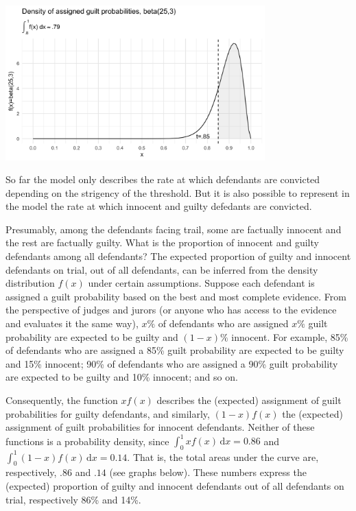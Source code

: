 \documentclass[10pt,dvipsnames]{scrartcl}
\begin{document}
\begin{center}
    \includegraphics[width=10cm]{dbeta(25,3)2.png}
\end{center}

So far the model only describes the rate at which defendants are
convicted depending on the strigency of the threshold. But it is also
possible to represent in the model the rate at which innocent and guilty
defedants are convicted.

Presumably, among the defendants facing trail, some are factually
innocent and the rest are factually guilty. What is the proportion of
innocent and guilty defendants among all defendants? The expected
proportion of guilty and innocent defendants on trial, out of all
defendants, can be inferred from the density distribution \(f(x)\) under
certain assumptions. Suppose each defendant is assigned a guilt
probability based on the best and most complete evidence. From the
perspective of judges and jurors (or anyone who has access to the
evidence and evaluates it the same way), \(x\%\) of defendants who are
assigned \(x\%\) guilt probability are expected to be guilty and
\((1-x)\%\) innocent. For example, 85\% of defendants who are assigned a
85\% guilt probability are expected to be guilty and 15\% innocent; 90\%
of defendants who are assigned a 90\% guilt probability are expected to
be guilty and 10\% innocent; and so on.

Consequently, the function \(xf(x)\) describes the (expected) assignment
of guilt probabilities for guilty defendants, and similarly,
\((1-x)f(x)\) the (expected) assignment of guilt probabilities for
innocent defendants. Neither of these functions is a probability
density, since \(\int_0^1 \! xf(x) \, \mathrm{d}x=0.86\) and
\(\int_0^1 \! (1-x)f(x) \, \mathrm{d}x=0.14\). That is, the total areas
under the curve are, respectively, \(.86\) and \(.14\) (see graphs
below). These numbers express the (expected) proportion of guilty and
innocent defendants out of all defendants on trial, respectively 86\%
and 14\%.
\end{document}
